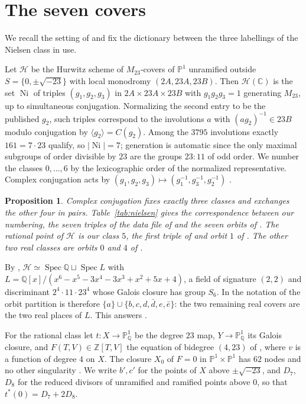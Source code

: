 \documentclass[11pt]{amsart}
\newtheorem{proposition}[theorem]{Proposition}
\theoremstyle{definition}
\newcommand{\QQ}{\mathbb{Q}}
\newcommand{\ZZ}{\mathbb{Z}}
\newcommand{\CC}{\mathbb{C}}
\newcommand{\PP}{\mathbb{P}}
\newcommand{\Ni}{\operatorname{Ni}}
\newcommand{\M}{M_{23}}
\newcommand{\cH}{\mathcal{H}}
\begin{document}
\section{The seven covers}\label{sec:covers}

We recall the setting of \cite{HJLPPZ26} and fix the dictionary between the three labellings of the Nielsen class in use.

Let $\cH$ be the Hurwitz scheme of $\M$-covers of $\PP^1$ unramified outside $S=\{0,\pm\sqrt{-23}\}$ with local monodromy $(2A,23A,23B)$. Then $\cH(\CC)$ is the set $\Ni$ of triples $(g_1,g_2,g_3)$ in $2A\times23A\times23B$ with $g_1g_2g_3=1$ generating $\M$, up to simultaneous conjugation. Normalizing the second entry to be the published $g_2$, such triples correspond to the involutions $a$ with $(ag_2)^{-1}\in23B$ modulo conjugation by $\langle g_2\rangle=C(g_2)$. Among the $3795$ involutions exactly $161=7\cdot23$ qualify, so $|\Ni|=7$; generation is automatic since the only maximal subgroups of order divisible by $23$ are the groups $23{:}11$ of odd order. We number the classes $0,\dots,6$ by the lexicographic order of the normalized representative. Complex conjugation acts by $(g_1,g_2,g_3)\mapsto(g_1^{-1},g_3^{-1},g_2^{-1})$ \cite[\S3.1]{HJLPPZ26}.



\begin{proposition}\label{prop:dictionary}
Complex conjugation fixes exactly three classes and exchanges the other four in pairs. Table~\ref{tab:nielsen} gives the correspondence between our numbering, the seven triples of the data file of \cite{HJLPPZ26} and the seven orbits of \cite[Table~1]{Janik26}. The rational point of $\cH$ is our class $5$, the first triple of \cite{HJLPPZ26} and orbit $1$ of \cite{Janik26}. The other two real classes are orbits $0$ and $4$ of \cite{Janik26}.
\end{proposition}

By \cite[\S3.7]{HJLPPZ26}, $\cH\simeq\operatorname{Spec}\QQ\sqcup\operatorname{Spec}L$ with $L=\QQ[x]/(x^6-x^5-3x^4-3x^3+x^2+5x+4)$, a field of signature $(2,2)$ and discriminant $2^4\cdot11\cdot23^4$ whose Galois closure has group $S_6$. In the notation of \cite[\S6]{Janik26} the orbit partition is therefore $\{a\}\cup\{b,c,d,\bar d,e,\bar e\}$: the two remaining real covers are the two real places of $L$. This answers \cite[Question 6.2]{Janik26}.

For the rational class let $t\colon X\to\PP^1_\QQ$ be the degree $23$ map, $Y\to\PP^1_\QQ$ its Galois closure, and $F(T,V)\in\ZZ[T,V]$ the equation of bidegree $(4,23)$ of \cite[\S3.4]{HJLPPZ26}, where $v$ is a function of degree $4$ on $X$. The closure $X_0$ of $F=0$ in $\PP^1\times\PP^1$ has $62$ nodes and no other singularity \cite[Prop.~3.10]{HJLPPZ26}. We write $b',c'$ for the points of $X$ above $\pm\sqrt{-23}$, and $D_7$, $D_8$ for the reduced divisors of unramified and ramified points above $0$, so that $t^*(0)=D_7+2D_8$.
\end{document}

